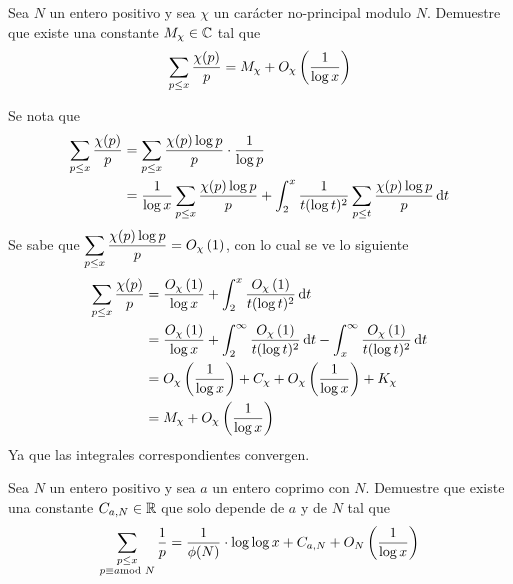 \begin{prob}[7 pts.]
	Sea $N$ un entero positivo y sea $\chi$ un carácter no-principal modulo $N$. Demuestre que existe una constante $M_\chi\in\mathbb{C}$ tal que
	\[\sum_{p\leq x}\frac{\chi(p)}{p}=M_\chi+O_\chi\left(\frac1{\log x}\right)\]
\end{prob}

\begin{sol}
	Se nota que
	\begin{align*}
		\sum_{p\leq x}\frac{\chi(p)}{p} & =\sum_{p\leq x}\frac{\chi(p)\log p}{p}\cdot \frac{1}{\log p}                                                               \\
		                                & =\frac1{\log x}\sum_{p\leq x}\frac{\chi(p)\log p}{p}+\int_2^x\frac1{t(\log t)^2}\sum_{p\leq t}\frac{\chi(p)\log p}{p}\operatorname{d}\!{t}
	\end{align*}
	Se sabe que $\displaystyle \sum_{p\leq x}\frac{\chi(p)\log p}{p}=O_\chi\left(1\right)$, con lo cual se ve lo siguiente
	\begin{align*}
		\sum_{p\leq x}\frac{\chi(p)}{p} & =\frac{O_\chi\left(1\right)}{\log x}+\int_2^x\frac{O_\chi\left(1\right)}{t(\log t)^2}\operatorname{d}\!{t}                                                            \\
		                                & =\frac{O_\chi\left(1\right)}{\log x}+\int_2^\infty\frac{O_\chi\left(1\right)}{t(\log t)^2}\operatorname{d}\!{t}-\int_x^\infty\frac{O_\chi\left(1\right)}{t(\log t)^2}\operatorname{d}\!{t} \\
		                                & =O_\chi\left(\frac1{\log x}\right)+C_\chi+O_\chi\left(\frac1{\log x}\right)+K_\chi                                                                    \\
		                                & =M_\chi + O_\chi\left(\frac1{\log x}\right)
	\end{align*}
	Ya que las integrales correspondientes convergen.
\end{sol}

\begin{prob}
	Sea $N$ un entero positivo y sea $a$ un entero coprimo con $N$. Demuestre que existe una constante $C_{a,N}\in\mathbb{R}$ que solo depende de $a$ y de $N$ tal que
	\[\sum_{\substack{p\leq x\\ p\equiv a\!\!\!\!\mod N}}\frac1p=\frac1{\phi(N)}\cdot\log\log x+C_{a,N}+O_N\left(\frac1{\log x}\right)\]
\end{prob}

\begin{sol}

\end{sol}

